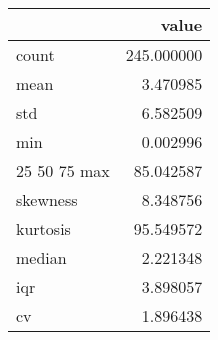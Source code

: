 \begin{tabular}{lr}
\toprule
 & value \\
\midrule
count & 245.000000 \\
mean & 3.470985 \\
std & 6.582509 \\
min & 0.002996 \\
25%
50%
75%
max & 85.042587 \\
skewness & 8.348756 \\
kurtosis & 95.549572 \\
median & 2.221348 \\
iqr & 3.898057 \\
cv & 1.896438 \\
\bottomrule
\end{tabular}
